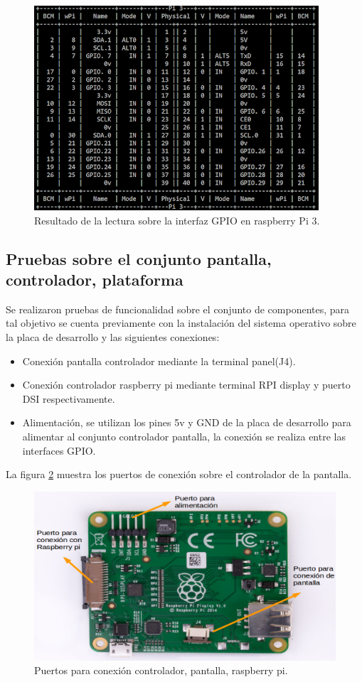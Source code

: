 \begin{figure}[h]
	\centering
	\includegraphics[scale =.7]{./Figures/readall.png}
	\caption{Resultado de la lectura sobre la interfaz GPIO en raspberry Pi 3.}
	\label{fig:readall}
\end{figure}


\subsection{Pruebas sobre el conjunto pantalla, controlador, plataforma}
Se realizaron pruebas de funcionalidad sobre el conjunto de componentes, para tal objetivo se cuenta previamente con la instalación del sistema operativo sobre la placa de desarrollo y las siguientes conexiones:

\begin{itemize}
\item Conexión pantalla controlador mediante la terminal panel(J4).
\item Conexión controlador raspberry pi mediante terminal RPI display y puerto DSI respectivamente.
\item Alimentación, se utilizan los pines 5v y GND de la placa de desarrollo para alimentar al conjunto controlador pantalla, la conexión se realiza entre las interfaces GPIO.
\end{itemize}

La figura \ref{fig:controlador} muestra los puertos de conexión sobre el controlador de la pantalla.

\begin{figure}[h]
	\centering
	\includegraphics[scale =.25]{./Figures/controlador.png}
	\caption{Puertos para conexión controlador, pantalla, raspberry pi.}
	\label{fig:controlador}
\end{figure}

